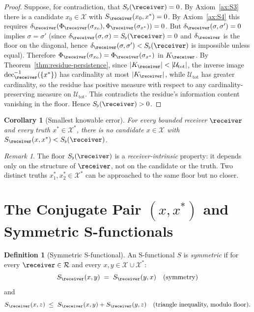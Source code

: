 \documentclass[11pt,a4paper]{article}
\theoremstyle{thmstyle}
\newtheorem{corollary}[theorem]{Corollary}
\theoremstyle{thmstyle}
\theoremstyle{definition}
\newtheorem{definition}[theorem]{Definition}
\theoremstyle{remark}
\newtheorem{remark}[theorem]{Remark}
\DeclareMathOperator{\dec}{dec}
\newcommand{\Receiver}{\mathcal{R}}
\newcommand{\Cands}{\mathcal{X}}
\newcommand{\Truth}{\mathcal{X}^{*}}
\newcommand{\Sub}{\mathcal{U}}
\newcommand{\Sscalar}{S}
\newcommand{\Sfloor}{S_{\flat}}
\begin{document}
\begin{proof}
Suppose, for contradiction, that
$\Sfloor(\receiver) = 0$.  By
Axiom~\ref{ax:S3} there is a candidate
$x_{0} \in \Cands$ with
$\Sscalar_{\receiver}(x_{0}, x^{*}) = 0$.  By
Axiom~\ref{ax:S4} this requires
$\delta_{\receiver}(\Phi_{\receiver}(\sigma_{x_{0}}),
                    \Phi_{\receiver}(\sigma_{x^{*}})) = 0$.
But $\delta_{\receiver}(\sigma, \sigma') = 0$ implies
$\sigma = \sigma'$ (since
$\delta_{\receiver}(\sigma,\sigma) = \Sfloor(\receiver) = 0$
and $\delta_{\receiver}$ is the floor on the diagonal,
hence $\delta_{\receiver}(\sigma,\sigma') < \Sfloor(\receiver)$
is impossible unless equal). Therefore
$\Phi_{\receiver}(\sigma_{x_{0}}) =
\Phi_{\receiver}(\sigma_{x^{*}})$ in $K_{\receiver}$.
By Theorem~\ref{thm:residue-persistence}, since
$|K_{\receiver}| < |\Sub_{\mathrm{tot}}|$, the inverse image
$\dec_{\receiver}^{-1}(\{x^{*}\})$ has cardinality at most
$|K_{\receiver}|$, while $\Sub_{\mathrm{tot}}$ has greater
cardinality, so the residue has positive measure with
respect to any cardinality-preserving measure on
$\Sub_{\mathrm{tot}}$.  This contradicts the residue's
information content vanishing in the floor.  Hence
$\Sfloor(\receiver) > 0$.
\end{proof}

\begin{corollary}[Smallest knowable error]\label{cor:smallest-knowable}
For every bounded receiver $\receiver$ and every truth
$x^{*} \in \Truth$, there is no candidate $x \in \Cands$
with $\Sscalar_{\receiver}(x, x^{*}) < \Sfloor(\receiver)$.
\end{corollary}

\begin{remark}\label{rem:floor-as-receiver-property}
The floor $\Sfloor(\receiver)$ is a \emph{receiver-intrinsic}
property: it depends only on the structure of $\receiver$,
not on the candidate or the truth.  Two distinct truths
$x_{1}^{*}, x_{2}^{*} \in \Truth$ can be approached
to the same floor but no closer.
\end{remark}

\section{The Conjugate Pair $(x, x^{*})$ and Symmetric S-functionals}
\label{sec:conjugate-pair}

\begin{definition}[Symmetric S-functional]\label{def:symmetric-S}
An S-functional $\Sscalar$ is \emph{symmetric} if for every
$\receiver \in \Receiver$ and every
$x, y \in \Cands \cup \Truth$:
\[
\Sscalar_{\receiver}(x, y)
\;=\; \Sscalar_{\receiver}(y, x)
\quad \text{(symmetry)}
\]
and
\[
\Sscalar_{\receiver}(x, z)
\;\leq\; \Sscalar_{\receiver}(x, y)
       + \Sscalar_{\receiver}(y, z)
\quad \text{(triangle inequality, modulo floor)}.
\]
\end{definition}
\end{document}
